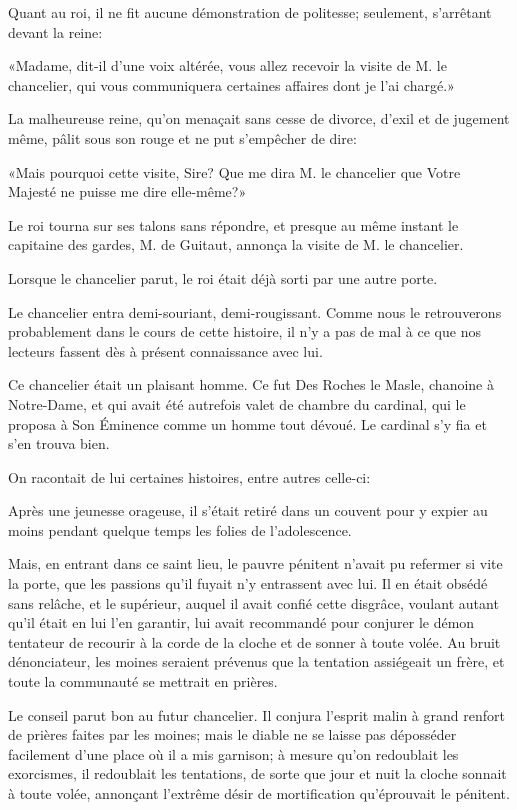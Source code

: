 Quant au roi, il ne fit aucune démonstration de politesse; seulement, s'arrêtant devant la reine: 

«Madame, dit-il d'une voix altérée, vous allez recevoir la visite de M. le chancelier, qui vous communiquera certaines affaires dont je l'ai chargé.» 

La malheureuse reine, qu'on menaçait sans cesse de divorce, d'exil et de jugement même, pâlit sous son rouge et ne put s'empêcher de dire: 

«Mais pourquoi cette visite, Sire? Que me dira M. le chancelier que Votre Majesté ne puisse me dire elle-même?» 

Le roi tourna sur ses talons sans répondre, et presque au même instant le capitaine des gardes, M. de Guitaut, annonça la visite de M. le chancelier. 

Lorsque le chancelier parut, le roi était déjà sorti par une autre porte. 

Le chancelier entra demi-souriant, demi-rougissant. Comme nous le retrouverons probablement dans le cours de cette histoire, il n'y a pas de mal à ce que nos lecteurs fassent dès à présent connaissance avec lui. 

Ce chancelier était un plaisant homme. Ce fut Des Roches le Masle, chanoine à Notre-Dame, et qui avait été autrefois valet de chambre du cardinal, qui le proposa à Son Éminence comme un homme tout dévoué. Le cardinal s'y fia et s'en trouva bien. 

On racontait de lui certaines histoires, entre autres celle-ci: 

Après une jeunesse orageuse, il s'était retiré dans un couvent pour y expier au moins pendant quelque temps les folies de l'adolescence. 

Mais, en entrant dans ce saint lieu, le pauvre pénitent n'avait pu refermer si vite la porte, que les passions qu'il fuyait n'y entrassent avec lui. Il en était obsédé sans relâche, et le supérieur, auquel il avait confié cette disgrâce, voulant autant qu'il était en lui l'en garantir, lui avait recommandé pour conjurer le démon tentateur de recourir à la corde de la cloche et de sonner à toute volée. Au bruit dénonciateur, les moines seraient prévenus que la tentation assiégeait un frère, et toute la communauté se mettrait en prières. 

Le conseil parut bon au futur chancelier. Il conjura l'esprit malin à grand renfort de prières faites par les moines; mais le diable ne se laisse pas déposséder facilement d'une place où il a mis garnison; à mesure qu'on redoublait les exorcismes, il redoublait les tentations, de sorte que jour et nuit la cloche sonnait à toute volée, annonçant l'extrême désir de mortification qu'éprouvait le pénitent. 

